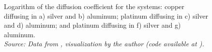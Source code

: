 \begin{figure}[h]
 \caption{Logarithm of the diffusion coefficient for the systems: copper diffusing in a) silver and b) aluminum; platinum diffusing in c) silver and d) aluminum; and platinum diffusing in f) silver and g) aluminum.\\ 
 \textit{Source: Data from \citep{kakusan}, visualization by the author (code available at \cite{mygit}).}}
 \label{fig:sigmas}
\end{figure}
